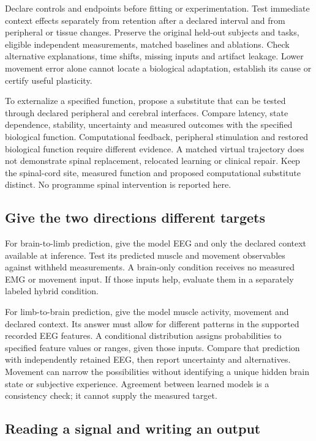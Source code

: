 Declare controls and endpoints before fitting or experimentation. Test
immediate context effects separately from retention after a declared interval
and from peripheral or tissue changes. Preserve the original held-out subjects
and tasks, eligible independent measurements, matched baselines and ablations.
Check alternative explanations, time shifts, missing inputs and artifact
leakage. Lower movement error alone cannot locate a biological adaptation,
establish its cause or certify useful plasticity.

To externalize a specified function, propose a substitute that can be tested
through declared peripheral and cerebral interfaces. Compare latency, state
dependence, stability, uncertainty and measured outcomes with the specified
biological function. Computational feedback, peripheral stimulation and restored
biological function require different evidence. A matched virtual trajectory
does not demonstrate spinal replacement, relocated learning or clinical repair.
Keep the spinal-cord site, measured function and proposed computational
substitute distinct. No programme spinal intervention is reported here.

\subsection{Give the two directions different targets}

For brain-to-limb prediction, give the model EEG and only the declared context
available at inference. Test its predicted muscle and movement observables
against withheld measurements. A brain-only condition receives no measured EMG
or movement input. If those inputs help, evaluate them in a separately labeled
hybrid condition.

For limb-to-brain prediction, give the model muscle activity, movement and
declared context. Its answer must allow for different patterns in the supported
recorded EEG features. A conditional distribution assigns probabilities to
specified feature values or ranges, given those inputs. Compare that prediction
with independently retained EEG, then report uncertainty and alternatives.
Movement can narrow the possibilities without identifying a unique hidden
brain state or subjective experience. Agreement between learned models is a
consistency check; it cannot supply the measured target.

\subsection{Reading a signal and writing an output}

